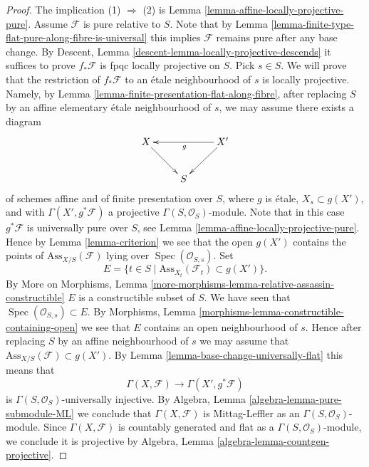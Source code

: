 \documentclass[10pt,a4paper]{amsart}
\theoremstyle{plain}
\theoremstyle{definition}
\theoremstyle{remark}
\numberwithin{equation}{subsection}
\def\Spec{\mathop{\mathrm{Spec}}}
\begin{document}
\begin{proof}
The implication (1) $\Rightarrow$ (2) is
Lemma \ref{lemma-affine-locally-projective-pure}.
Assume $\mathcal{F}$ is pure relative to $S$.
Note that by
Lemma \ref{lemma-finite-type-flat-pure-along-fibre-is-universal}
this implies $\mathcal{F}$ remains pure after any base change. By
Descent, Lemma \ref{descent-lemma-locally-projective-descends}
it suffices to prove $f_*\mathcal{F}$ is fpqc locally projective on $S$.
Pick $s \in S$. We will prove that the restriction of
$f_*\mathcal{F}$ to an \'etale neighbourhood of $s$ is locally projective.
Namely, by
Lemma \ref{lemma-finite-presentation-flat-along-fibre},
after replacing $S$ by an affine elementary \'etale
neighbourhood of $s$, we may assume there exists a diagram
$$
\xymatrix{
X \ar[dr] & & X' \ar[ll]^g \ar[ld] \\
& S &
}
$$
of schemes affine and of finite presentation over $S$,
where $g$ is \'etale, $X_s \subset g(X')$, and with
$\Gamma(X', g^*\mathcal{F})$ a projective $\Gamma(S, \mathcal{O}_S)$-module.
Note that in this case $g^*\mathcal{F}$ is universally pure over $S$, see
Lemma \ref{lemma-affine-locally-projective-pure}.
Hence by
Lemma \ref{lemma-criterion}
we see that the open $g(X')$ contains the points of
$\text{Ass}_{X/S}(\mathcal{F})$ lying over $\Spec(\mathcal{O}_{S, s})$.
Set
$$
E = \{t \in S \mid \text{Ass}_{X_t}(\mathcal{F}_t) \subset g(X') \}.
$$
By
More on Morphisms,
Lemma \ref{more-morphisms-lemma-relative-assassin-constructible}
$E$ is a constructible subset of $S$. We have seen that
$\Spec(\mathcal{O}_{S, s}) \subset E$. By
Morphisms, Lemma \ref{morphisms-lemma-constructible-containing-open}
we see that $E$ contains an open neighbourhood of $s$. Hence after
replacing $S$ by an affine neighbourhood of $s$ we may assume that
$\text{Ass}_{X/S}(\mathcal{F}) \subset g(X')$.
By
Lemma \ref{lemma-base-change-universally-flat}
this means that
$$
\Gamma(X, \mathcal{F}) \longrightarrow \Gamma(X', g^*\mathcal{F})
$$
is $\Gamma(S, \mathcal{O}_S)$-universally injective.
By Algebra, Lemma \ref{algebra-lemma-pure-submodule-ML}
we conclude that $\Gamma(X, \mathcal{F})$ is Mittag-Leffler as an
$\Gamma(S, \mathcal{O}_S)$-module. Since
$\Gamma(X, \mathcal{F})$ is countably generated and flat as a
$\Gamma(S, \mathcal{O}_S)$-module, we conclude
it is projective by
Algebra, Lemma \ref{algebra-lemma-countgen-projective}.
\end{proof}
\end{document}
